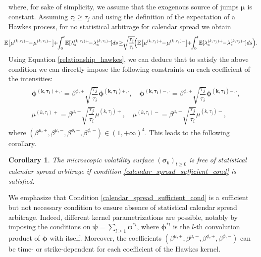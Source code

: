 \documentclass[12pt]{article}
\newtheorem{corollary}[theorem2]{Corollary}
\begin{document}
where, for sake of simplicity, we assume that the exogenous source of jumps $\boldsymbol\mu$ is constant. Assuming $\tau_i \geq \tau_j$ and using the definition of the expectation of a Hawkes process, for no statistical arbitrage for calendar spread we obtain
\begin{align}\label{ineq_calendar_spread}
 \hspace{-3mm}   \mathbb{E}\big[\mu^{(k,\tau_i)+} \!\! - \! \mu^{(k,\tau_i)-}\big] \!\!+\!\! \int_0^t\! \mathbb{E}[\lambda^{(k,\tau_i)+}_s\!\! -\! \lambda^{(k,\tau_i)-}_s\!] ds \!\geq\!\! \sqrt{\frac{\tau_j}{\tau_i}}\!\Big(\mathbb{E}\big[\mu^{(k,\tau_j)+}\!\!-\!\mu^{(k,\tau_j)-}\big]\!\! +\!\! \int_0^t\! \mathbb{E}[\lambda^{(k,\tau_j)+}_s\!\!-\!\lambda^{(k,\tau_j)-}_s\!] ds \Big). 
\end{align}
Using Equation \eqref{relationship_hawkes}, we can deduce that to satisfy the above condition we can directly impose the following constraints on each coefficient of the intensities:
\begin{align}\label{calendar_spread_sufficient_cond}
\begin{split}
     & \boldsymbol{\phi^{(k,\tau_i)+, \cdot}} =\beta^{\phi,+} \sqrt{\dfrac{\tau_j}{\tau_i}} \boldsymbol{\phi^{(k,\tau_j)+, \cdot}}, \quad 
    \boldsymbol{\phi^{(k,\tau_i)-, \cdot}} = \beta^{\phi,+}\sqrt{\dfrac{\tau_j}{\tau_i}} \boldsymbol{\phi^{(k,\tau_j)-, \cdot}}, \\
    & \mu^{(k,\tau_i)+} = \beta^{\mu,+}\sqrt{\dfrac{\tau_j}{\tau_i}}\mu^{(k,\tau_j)+},\quad  \mu^{(k,\tau_i)-} = \beta^{\mu,-}\sqrt{\dfrac{\tau_j}{\tau_i}}\mu^{(k,\tau_j)-},
\end{split}
\end{align}
where $(\beta^{\mu,+},\beta^{\mu,-},\beta^{\phi,+},\beta^{\phi,-})\in (1,+\infty)^4$. This leads to the following corollary.
\begin{corollary}
The microscopic volatility surface $(\boldsymbol{\sigma_t})_{t\geq0}$ is free of statistical calendar spread arbitrage if condition \eqref{calendar_spread_sufficient_cond} is satisfied. 
\end{corollary}
We emphasize that Condition \eqref{calendar_spread_sufficient_cond} is a sufficient but not necessary condition to ensure absence of statistical calendar spread arbitrage. Indeed, different kernel parametrizations are possible, notably by imposing the conditions on $\boldsymbol{\psi} = \sum_{l \geq 1} \boldsymbol{\phi}^{*l}$, where $\boldsymbol{\phi}^{*l}$ is the $l$-th convolution product of $\boldsymbol{\phi}$ with itself. Moreover, the coefficients $(\beta^{\mu,+}, \beta^{\mu,-}, \beta^{\phi,+}, \beta^{\phi,-})$ can be time- or strike-dependent for each coefficient of the Hawkes kernel. \medskip
\end{document}
